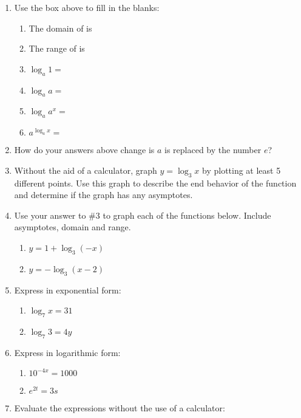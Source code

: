\documentclass[11pt]{article}
\begin{document}
\begin{enumerate}
\item Use the box above to fill in the blanks:
\begin{enumerate}
\item The domain of  is\\
\item The range of  is\\
\item $\log_a 1= \hspace{1in}$\\
\item $\log_a a= \hspace{1in}$\\
\item $\log_a a^x= \hspace{1in}$\\
\item $a^{\log_ax} = \hspace{1in}$\\
\end{enumerate}
\item How do your answers above change is $a$ is replaced by the number $e$?
\newpage
\item Without the aid of a calculator, graph $y=\log_3 x$ by plotting at least 5 different points. Use this graph to describe the end behavior of the function and determine if the graph has any asymptotes.
\vspace{2in}
\item Use your answer to \#3 to graph each of the functions below. Include asymptotes, domain and range.
\begin{enumerate}
\item  $y=1+\log_3 (-x)$
\vspace{2in}
\item  $y=-\log_3 (x-2)$
\vspace{2in}
\end{enumerate}
\item Express in exponential form: 
\begin{enumerate}
\item $\log_{7}x=31$
\item $\log_{7}3=4y$
\end{enumerate}
\item Express in logarithmic form:
\begin{enumerate}
\item $10^{-4x}=1000$
\item $e^{2t}=3s$
\end{enumerate}
\newpage
\item Evaluate the expressions without the use of a calculator:\\


\end{enumerate}
\end{document}
